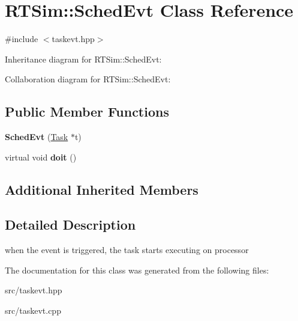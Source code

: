 \hypertarget{classRTSim_1_1SchedEvt}{}\section{R\+T\+Sim\+:\+:Sched\+Evt Class Reference}
\label{classRTSim_1_1SchedEvt}


{\ttfamily \#include $<$taskevt.\+hpp$>$}



Inheritance diagram for R\+T\+Sim\+:\+:Sched\+Evt\+:


Collaboration diagram for R\+T\+Sim\+:\+:Sched\+Evt\+:
\subsection*{Public Member Functions}
\begin{DoxyCompactItemize}
\item 
{\bfseries Sched\+Evt} (\hyperlink{classRTSim_1_1Task}{Task} $\ast$t)
\item 
virtual void {\bfseries doit} ()
\end{DoxyCompactItemize}
\subsection*{Additional Inherited Members}


\subsection{Detailed Description}
when the event is triggered, the task starts executing on processor 

The documentation for this class was generated from the following files\+:\begin{DoxyCompactItemize}
\item 
src/taskevt.\+hpp\item 
src/taskevt.\+cpp\end{DoxyCompactItemize}
